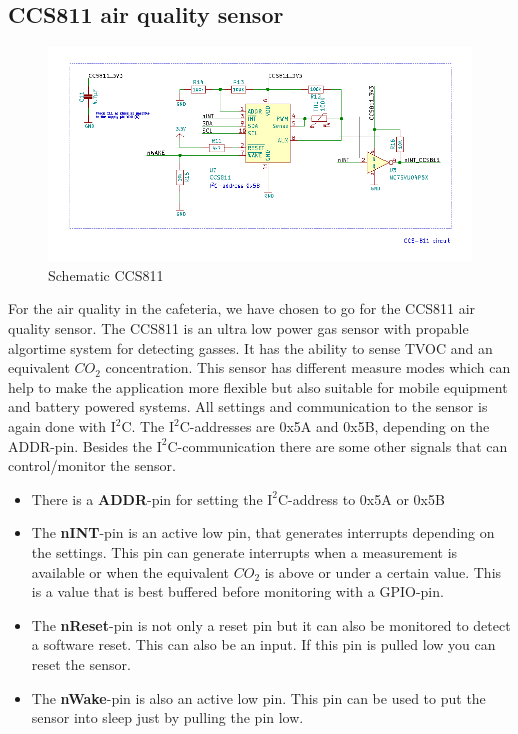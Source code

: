 \documentclass[11pt,a4paper]{article}
\begin{document}
\subsection{CCS811 air quality sensor}
\begin{figure}[H]
	\centering
	\includegraphics[width=0.8\linewidth]{Schematic_CCS811.png}
	\caption{Schematic CCS811}
	\label{fig:CCS811}
\end{figure}
For the air quality in the cafeteria, we have chosen to go for the CCS811 air quality sensor. The CCS811 is an ultra low power gas sensor with propable algortime system for detecting gasses. It has the ability to sense TVOC and an equivalent $CO_{2}$ concentration. This sensor has different measure modes which can help to make the application more flexible but also suitable for mobile equipment and battery powered systems. All settings and communication to the sensor is again done with $\text{I}^2$C. The $\text{I}^2$C-addresses are 0x5A and 0x5B, depending on the ADDR-pin. Besides the $\text{I}^2$C-communication there are some other signals that can control/monitor the sensor. 
\begin{itemize}
	\item There is a \textbf{ADDR}-pin for setting the $\text{I}^2$C-address to 0x5A or 0x5B
	\item The\textbf{ nINT}-pin is an active low pin, that generates interrupts depending on the settings. This pin can generate interrupts when a measurement is available or when the equivalent $CO_{2}$ is above or under a certain value. This is a value that is best buffered before monitoring with a GPIO-pin.
	\item The \textbf{nReset}-pin is not only a reset pin but it can also be monitored to detect a software reset. This can also be an input. If this pin is pulled low you can reset the sensor.
	\item The \textbf{nWake}-pin is also an active low pin. This pin can be used to put the sensor into sleep just by pulling the pin low.
\end{itemize}
\end{document}
